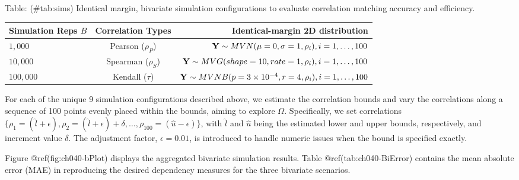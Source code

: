 \documentclass[
]{jss}
\begin{document}
Table: (\#tab:sims) Identical margin, bivariate simulation
configurations to evaluate correlation matching accuracy and efficiency.

\begin{table}[]
\begin{tabular}{@{}lcr@{}}
\toprule
Simulation Reps $B$ & Correlation Types & Identical-margin 2D distribution \\ \midrule
$1,000$ & Pearson ($\rho_P$) & ${\bf Y} \sim MVN( \mu= 0 , \sigma = 1, \rho_i ), i=1,\ldots,100$ \\
$10,000$ & Spearman ($\rho_S$) & ${\bf Y} \sim MVG( shape = 10, rate = 1, \rho_i ), i=1,\ldots,100$ \\
$100,000$ & Kendall ($\tau$) & ${\bf Y} \sim MVNB(p = 3\times10^{-4}, r = 4,\rho_i), i=1,\ldots,100$ \\ \bottomrule
\end{tabular}
\end{table}

For each of the unique 9 simulation configurations described above, we
estimate the correlation bounds and vary the correlations along a
sequence of 100 points evenly placed within the bounds, aiming to
explore \(\Omega\). Specifically, we set correlations
\(\{ \rho_1 = ( \hat{l} + \epsilon), \rho_2 = (\hat{l} + \epsilon) + \delta, \ldots, \rho_{100} = (\hat{u} - \epsilon) \}\),
with \(\hat{l}\) and \(\hat{u}\) being the estimated lower and upper
bounds, respectively, and increment value \(\delta\). The adjustment
factor, \(\epsilon=0.01\), is introduced to handle numeric issues when
the bound is specified exactly.

Figure @ref(fig:ch040-bPlot) displays the aggregated bivariate
simulation results. Table @ref(tab:ch040-BiError) contains the mean
absolute error (MAE) in reproducing the desired dependency measures for
the three bivariate scenarios.
\end{document}
